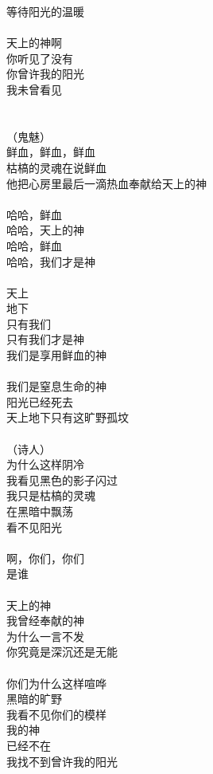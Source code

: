 等待阳光的温暖\\
\\
天上的神啊\\
你听见了没有\\
你曾许我的阳光\\
我未曾看见\\
\\
\\
（鬼魅）\\
鲜血，鲜血，鲜血\\
枯槁的灵魂在说鲜血\\
他把心房里最后一滴热血奉献给天上的神\\
\\
哈哈，鲜血\\
哈哈，天上的神\\
哈哈，鲜血\\
哈哈，我们才是神\\
\\
天上\\
地下\\
只有我们\\
只有我们才是神\\
我们是享用鲜血的神\\
\\
我们是窒息生命的神\\
阳光已经死去\\
天上地下只有这旷野孤坟\\
\\
（诗人）\\
为什么这样阴冷\\
我看见黑色的影子闪过\\
我只是枯槁的灵魂\\
在黑暗中飘荡\\
看不见阳光\\
\\
啊，你们，你们\\
是谁\\
\\
天上的神\\
我曾经奉献的神\\
为什么一言不发\\
你究竟是深沉还是无能\\
\\
你们为什么这样喧哗\\
黑暗的旷野\\
我看不见你们的模样\\
我的神\\
已经不在\\
我找不到曾许我的阳光\\
